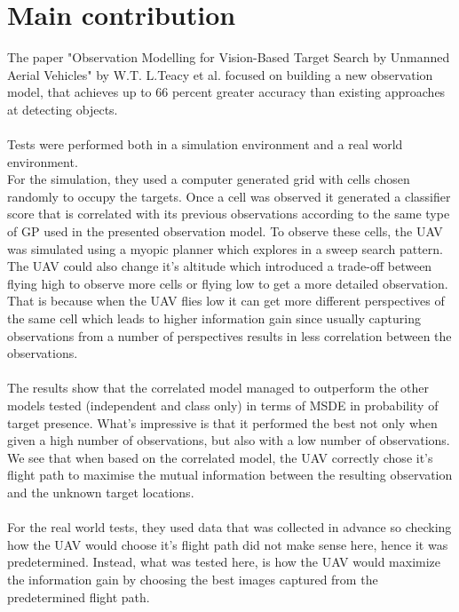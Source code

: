 \documentclass{article}
\begin{document}
	\section{Main contribution}
	The paper "Observation Modelling for Vision-Based Target Search by Unmanned Aerial Vehicles" by W.T. L.Teacy et al. focused on building a new observation model, that achieves up to 66 percent greater accuracy than existing approaches at detecting objects. \\ \\
	Tests were performed both in a simulation environment and a real world environment. \\
	For the simulation, they used a computer generated grid with cells chosen randomly to occupy the targets. Once a cell was observed it generated a classifier score that is correlated with its previous observations according to the same type of GP used in the presented observation model. To observe these cells, the UAV was simulated using a myopic planner which explores in a sweep search pattern. The UAV could also change it's altitude which introduced a trade-off between flying high to observe more cells or flying low to get a more detailed observation. That is because when the UAV flies low it can get more different perspectives of the same cell which leads to higher information gain since usually capturing observations from a number of perspectives results in less correlation between the observations. \\ \\
	The results show that the correlated model managed to outperform the other models tested (independent and class only) in terms of MSDE in probability of target presence. What's impressive is that it performed the best not only when given a high number of observations, but also with a low number of observations. We see that when based on the correlated model, the UAV correctly chose it's flight path to maximise the mutual information between the resulting observation and the unknown target locations. \\ \\
	For the real world tests, they used data that was collected in advance so checking how the UAV would choose it's flight path did not make sense here, hence it was predetermined. Instead, what was tested here, is how the UAV would maximize the information gain by choosing the best images captured from the predetermined flight path.\\
\end{document}
